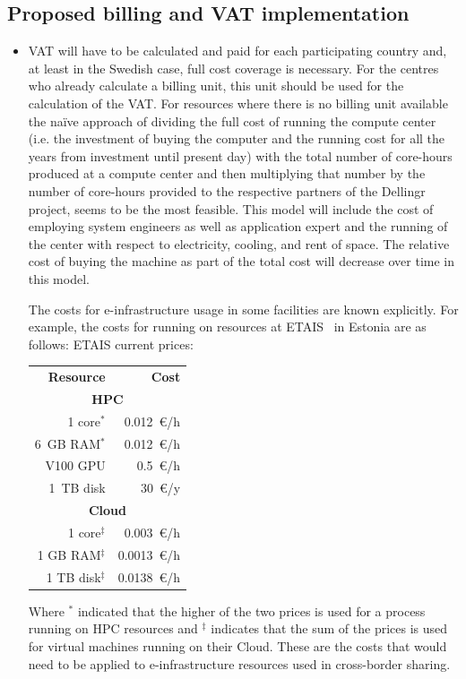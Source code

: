 \documentclass{article}
\newcommand{\dell}{Dellingr\xspace}
\newcommand{\einfra}{e-infrastructure\xspace}
\begin{document}
\subsection{Proposed billing and VAT implementation} 
\begin{itemize}
    \item []
VAT will have to be calculated and paid for each participating country and, at least in the Swedish case, full cost coverage is necessary. For the centres who already calculate a billing unit, this unit should be used for the calculation of the VAT. 
For resources where there is no billing unit available  the na\"ive approach of dividing the full cost of running the compute center (i.e. the investment of buying the computer and the running cost for all the years from investment until present day) with the total number of core-hours produced at a compute center and then multiplying that number by the number of core-hours provided to the respective partners of the \dell project, seems to be the most feasible. 
This model will include the cost of employing system engineers as well as application expert and the running of the center with respect to electricity, cooling, and rent of space. The relative cost of buying the machine as part of the total cost will decrease over time in this model.

The costs for \einfra usage in some facilities are known explicitly.
For example, the costs for running on resources at ETAIS~\cite{etais} in Estonia are as follows:
ETAIS current prices:
\begin{center}
\begin{tabular}{r r}
{\bf Resource}& {\bf Cost} \\
\multicolumn{2}{c}{\bf HPC} \\
1 core$^*$     &  0.012~\euro/h \\
6~GB RAM$^*$     & 0.012~\euro/h \\
V100 GPU   & 0.5~\euro/h \\
1~TB disk  & 30~\euro/y  \\
\multicolumn{2}{c}{\bf Cloud} \\
1 core$^\ddag$ & 0.003~\euro/h \\
1 GB RAM$^\ddag$ & 0.0013~\euro/h \\
1 TB disk$^\ddag$ & 0.0138~\euro/h
\end{tabular}
\end{center}
Where $^*$ indicated that the higher of the two prices is used for a process running on HPC resources and $^\ddag$ indicates that the sum of the prices is used for virtual machines running on their Cloud.
These are the costs that would need to be applied to \einfra resources used in cross-border sharing.

\end{itemize}
\end{document}

